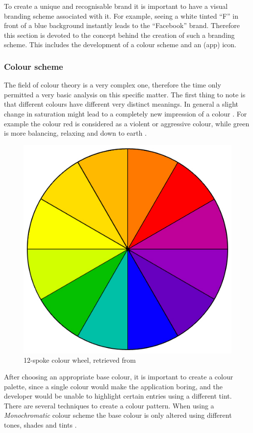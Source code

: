 To create a unique and recognisable brand it is important to have a visual branding scheme associated with it. For example, seeing a white tinted \enquote{F} in front of a blue background instantly leads to the \enquote{Facebook} brand. Therefore this section is devoted to the concept behind the creation of such a branding scheme. This includes the development of a colour scheme and an (app) icon.

\subsubsection{Colour scheme}
\label{sec:ColourConcept}

The field of colour theory is a very complex one, therefore the time only permitted a very basic analysis on this specific matter. The first thing to note is that different colours have different very distinct meanings. In general a slight change in saturation might lead to a completely new impression of a colour \cite{Chapman:2010aa}. For example the colour red is considered as a violent or aggressive colour, while green is more balancing, relaxing and down to earth \cite{Chapman:2010aa}.

\begin{figure}[h]
  	\centering
  	\includegraphics[width=0.5\linewidth]{./images/colorwheel.jpg}
  	\caption{12-spoke colour wheel, retrieved from \cite{Chapman:2010ab}}
	\label{fig:ColourWheel}
\end{figure}

After choosing an appropriate base colour, it is important to create a colour palette, since a single colour would make the application boring, and the developer would be unable to highlight certain entries using a different tint. There are several techniques to create a colour pattern. When using a \emph{Monochromatic} colour scheme the base colour is only altered using different tones, shades and tints \cite{Chapman:2010ab}. 


